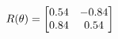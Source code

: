 \documentclass[preview]{standalone}
\begin{document}
\begin{align*}
\special{dvisvgm:raw <g id='unique000'>}R(\theta) = \begin{bmatrix}0.54 & -0.84\\0.84 & 0.54\end{bmatrix}\special{dvisvgm:raw </g>}
\end{align*}
\end{document}
